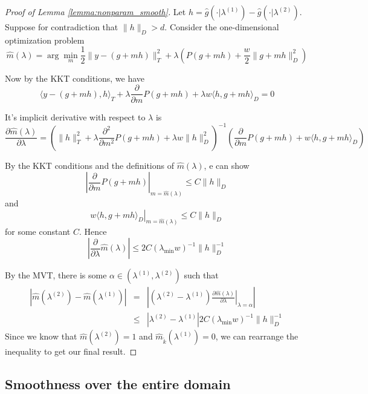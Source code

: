 \documentclass[12pt]{article}
\begin{document}
\begin{proof}[Proof of Lemma \ref{lemma:nonparam_smooth}]

Let $h=\hat{g}(\cdot|\lambda^{(1)})-\hat{g}(\cdot|\lambda^{(2)})$. Suppose for contradiction that $\|h\|_{D} > d$.
Consider the one-dimensional optimization problem
\[
\hat{m}(\lambda) = \arg\min_{m}\frac{1}{2}\|y- \left(g +mh\right)\|_{T}^{2}+\lambda\left(P(g+mh)+\frac{w}{2}\|g+mh\|_{D}^{2}\right)
\]

Now by the KKT conditions, we have
\[
\langle y-\left(g+mh\right),h\rangle_{T}+\lambda\frac{\partial}{\partial m}P(g+mh)+\lambda w \langle h,g+mh\rangle_{D}=0
\]


It's implicit derivative with respect to $\lambda$ is
\begin{equation}
 \frac{\partial\hat{m}(\lambda)}{\partial\lambda}  =
\left ( \| h\|_{T}^2 +\lambda\frac{\partial^{2}}{\partial m^{2}}P(g+mh) +\lambda w\|h\|_{D}^{2} \right )^{-1}
\left ( \frac{\partial}{\partial m}P(g+mh)+w\langle h,g+mh\rangle_{D} \right )
\end{equation}

By the KKT conditions and the definitions of $\hat{m}(\lambda)$, e can show
\[
\left | \frac{\partial}{\partial m}P(g+mh) \right |_{m = \hat{m}(\lambda)}  \le
C \|h\|_{D}
\]
and
$$
\left . w\langle h,g+mh\rangle_{D} \right |_{m = \hat{m}(\lambda)} \le C \|h\|_{D}
$$
for some constant $C$.
Hence
\[
\left|\frac{\partial}{\partial\lambda}\hat{m}(\lambda)\right| \le
2C (\lambda_{\min}w)^{-1}\|h\|_{D}^{-1}
\]

By the MVT, there is some $\alpha\in (\lambda^{(1)},\lambda^{(2)})$ such that
\begin{eqnarray*}
\left|\hat{m}(\lambda^{(2)})-\hat{m}(\lambda^{(1)})\right| & = &
\left|\left ( \lambda^{(2)}-\lambda^{(1)} \right )
\left . \frac{\partial \hat{m}(\lambda) }{\partial\lambda}\right |_{\lambda=\alpha} \right|\\
 & \le & |\lambda^{(2)}-\lambda^{(1)}|
2C (\lambda_{\min}w)^{-1}\|h\|_{D}^{-1}
\end{eqnarray*}
Since we know that $\hat{m}(\lambda^{(2)})=1$
and $\hat{m}_{\tilde{k}}(\lambda^{(1)})=0$, we can rearrange the inequality to get our final result.
\end{proof}

\subsection{Smoothness over the entire domain}
\label{sec:smoothness_domain}
\end{document}
